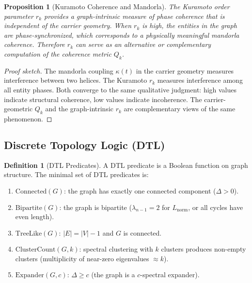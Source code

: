 \documentclass[11pt,a4paper,twoside]{article}
\theoremstyle{definition}
\newtheorem{definition}{Definition}[section]
\theoremstyle{plain}
\newtheorem{proposition}{Proposition}[section]
\theoremstyle{remark}
\begin{document}
\begin{proposition}[Kuramoto Coherence and Mandorla]\label{prop:kuramandorla}
The Kuramoto order parameter $r_k$ provides a graph-intrinsic measure
of phase coherence that is independent of the carrier geometry. When
$r_k$ is high, the entities in the graph are phase-synchronized, which
corresponds to a physically meaningful mandorla coherence. Therefore
$r_k$ can serve as an alternative or complementary computation of the
coherence metric $Q_k$.
\end{proposition}

\begin{proof}[Proof sketch]
The mandorla coupling $\kappa(t)$ in the carrier geometry measures
interference between two helices. The Kuramoto $r_k$ measures
interference among all entity phases. Both converge to the same
qualitative judgment: high values indicate structural coherence,
low values indicate incoherence. The carrier-geometric $Q_k$ and the
graph-intrinsic $r_k$ are complementary views of the same phenomenon.
\end{proof}


\subsection{Discrete Topology Logic (DTL)}

\begin{definition}[DTL Predicates]\label{def:dtl}
A DTL predicate is a Boolean function on graph structure. The minimal
set of DTL predicates is:
\begin{enumerate}[nosep,label=(\roman*)]
  \item $\mathrm{Connected}(G)$: the graph has exactly one connected
        component ($\Delta > 0$).
  \item $\mathrm{Bipartite}(G)$: the graph is bipartite
        ($\lambda_{n-1} = 2$ for $L_{\mathrm{norm}}$, or all cycles
        have even length).
  \item $\mathrm{TreeLike}(G)$: $|E| = |V| - 1$ and $G$ is connected.
  \item $\mathrm{ClusterCount}(G, k)$: spectral clustering with $k$
        clusters produces non-empty clusters (multiplicity of
        near-zero eigenvalues $\approx k$).
  \item $\mathrm{Expander}(G, c)$: $\Delta \ge c$ (the graph is a
        $c$-spectral expander).
\end{enumerate}
\end{definition}
\end{document}
